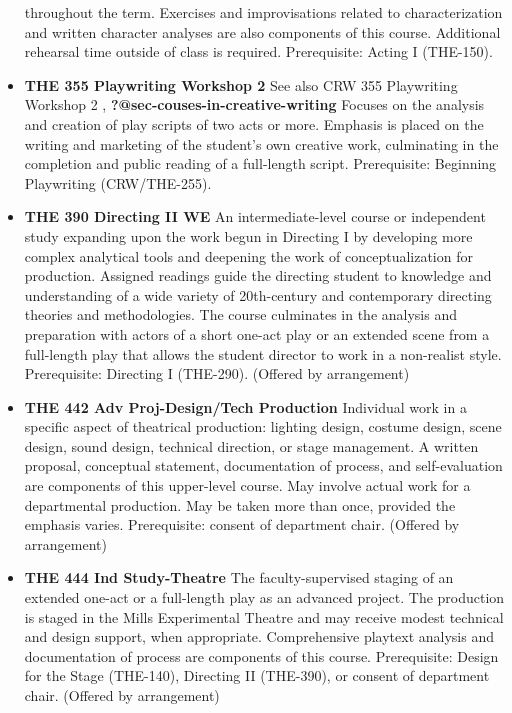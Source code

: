 \documentclass[
  letterpaper,
]{scrbook}
\begin{document}
\begin{itemize}
  throughout the term. Exercises and improvisations related to
  characterization and written character analyses are also components of
  this course. Additional rehearsal time outside of class is required.
  Prerequisite: Acting I (THE-150).
\item
  \textbf{THE 355 Playwriting Workshop 2} See also CRW 355 Playwriting
  Workshop 2 , \textbf{?@sec-couses-in-creative-writing} Focuses on the
  analysis and creation of play scripts of two acts or more. Emphasis is
  placed on the writing and marketing of the student's own creative
  work, culminating in the completion and public reading of a
  full-length script. Prerequisite: Beginning Playwriting
  (CRW/THE-255).\\
\item
  \textbf{THE 390 Directing II WE} An intermediate-level course or
  independent study expanding upon the work begun in Directing I by
  developing more complex analytical tools and deepening the work of
  conceptualization for production. Assigned readings guide the
  directing student to knowledge and understanding of a wide variety of
  20th-century and contemporary directing theories and methodologies.
  The course culminates in the analysis and preparation with actors of a
  short one-act play or an extended scene from a full-length play that
  allows the student director to work in a non-realist style.
  Prerequisite: Directing I (THE-290). (Offered by arrangement)
\item
  \textbf{THE 442 Adv Proj-Design/Tech Production} Individual work in a
  specific aspect of theatrical production: lighting design, costume
  design, scene design, sound design, technical direction, or stage
  management. A written proposal, conceptual statement, documentation of
  process, and self-evaluation are components of this upper-level
  course. May involve actual work for a departmental production. May be
  taken more than once, provided the emphasis varies. Prerequisite:
  consent of department chair. (Offered by arrangement)\\
\item
  \textbf{THE 444 Ind Study-Theatre} The faculty-supervised staging of
  an extended one-act or a full-length play as an advanced project. The
  production is staged in the Mills Experimental Theatre and may receive
  modest technical and design support, when appropriate. Comprehensive
  playtext analysis and documentation of process are components of this
  course. Prerequisite: Design for the Stage (THE-140), Directing II
  (THE-390), or consent of department chair. (Offered by arrangement)

\end{itemize}
\end{document}
